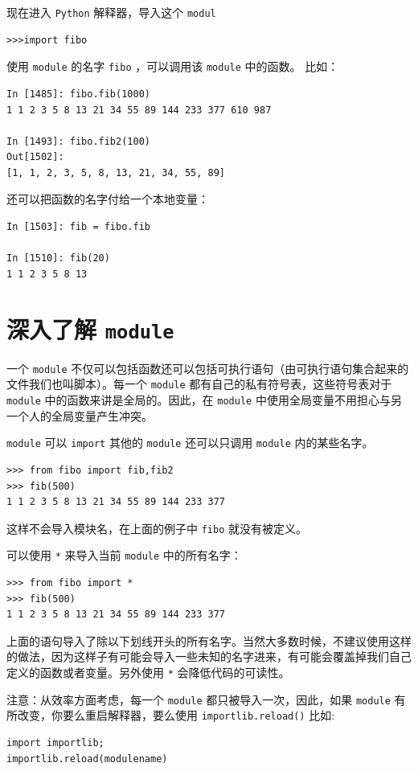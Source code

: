 \documentclass[10pt,a4paper,UTF8]{article}
\begin{document}
现在进入 \texttt{Python} 解释器，导入这个 \texttt{modul} 

\begin{verbatim}
>>>import fibo
\end{verbatim}

使用 \texttt{module} 的名字 \texttt{fibo} ，可以调用该 \texttt{module} 中的函数。 比如：
\begin{verbatim}
In [1485]: fibo.fib(1000)
1 1 2 3 5 8 13 21 34 55 89 144 233 377 610 987 

In [1493]: fibo.fib2(100)
Out[1502]: 
[1, 1, 2, 3, 5, 8, 13, 21, 34, 55, 89]
\end{verbatim}

还可以把函数的名字付给一个本地变量：
\begin{verbatim}
In [1503]: fib = fibo.fib

In [1510]: fib(20)
1 1 2 3 5 8 13
\end{verbatim}
\section{深入了解 \texttt{module}}
\label{sec:org921b128}


一个 \texttt{module} 不仅可以包括函数还可以包括可执行语句（由可执行语句集合起来的文件我们也叫脚本）。每一个 \texttt{module} 都有自己的私有符号表，这些符号表对于 \texttt{module} 中的函数来讲是全局的。因此，在 \texttt{module} 中使用全局变量不用担心与另一个人的全局变量产生冲突。

\texttt{module} 可以 \texttt{import} 其他的 \texttt{module} 还可以只调用 \texttt{module} 内的某些名字。

\begin{verbatim}
>>> from fibo import fib,fib2
>>> fib(500)
1 1 2 3 5 8 13 21 34 55 89 144 233 377
\end{verbatim}
这样不会导入模块名，在上面的例子中 \texttt{fibo} 就没有被定义。

可以使用 \texttt{*} 来导入当前 \texttt{module} 中的所有名字：
\begin{verbatim}
>>> from fibo import *
>>> fib(500)
1 1 2 3 5 8 13 21 34 55 89 144 233 377
\end{verbatim}
上面的语句导入了除以下划线开头的所有名字。当然大多数时候，不建议使用这样的做法，因为这样子有可能会导入一些未知的名字进来，有可能会覆盖掉我们自己定义的函数或者变量。另外使用 \texttt{*} 会降低代码的可读性。

注意：从效率方面考虑，每一个 \texttt{module} 都只被导入一次，因此，如果 \texttt{module} 有所改变，你要么重启解释器，要么使用 \texttt{importlib.reload()} 比如: 
\begin{verbatim}
import importlib;
importlib.reload(modulename)
\end{verbatim}
\end{document}
